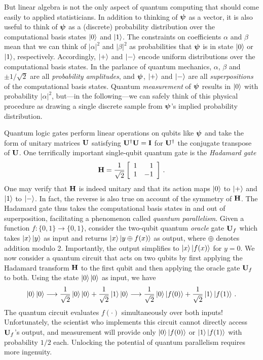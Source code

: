 \documentclass[12pt]{article} %
\begin{document}
But linear algebra is not the only aspect of quantum computing that should come easily to applied statisticians. In addition to thinking of $\boldsymbol{\psi}$ as a vector, it is also useful to think of $\boldsymbol{\psi}$ as a (discrete) probability distribution over the computational basis states $\ket{0}$ and $\ket{1}$. The constraints on coefficients $\alpha$ and $\beta$ mean that we can think of $|\alpha|^2$ and $|\beta|^2$ as probabilities that $\boldsymbol{\psi}$ is in state $\ket{0}$ or $\ket{1}$, respectively.  Accordingly, $\ket{+}$ and $\ket{-}$ encode uniform distributions over the computational basis states.  In the parlance of quantum mechanics, $\alpha$, $\beta$ and $\pm1/\sqrt{2}$ are all \emph{probability amplitudes}, and $\boldsymbol{\psi}$, $\ket{+}$ and $\ket{-}$ are all \emph{superpositions} of the computational basis states. Quantum \emph{measurement} of $\boldsymbol{\psi}$ results in $\ket{0}$ with probability $|\alpha|^2$, but---in the following---we can safely think of this physical procedure as drawing a single discrete sample from $\boldsymbol{\psi}$'s implied probability distribution.

Quantum logic gates perform linear operations on qubits like $\boldsymbol{\psi}$ and take the form of unitary matrices $\mathbf{U}$ satisfying $\mathbf{U}^\dagger \mathbf{U}=\mathbf{I}$ for $\mathbf{U}^\dagger$ the conjugate transpose of $\mathbf{U}$. One terrifically important single-qubit quantum gate is the \emph{Hadamard gate}
\begin{align*}
	\mathbf{H} = \frac{1}{\sqrt{2}} \left[\begin{array}{rr}
		1 & 1 \\
		1 & -1 \end{array}\right] \, .
\end{align*}
One may verify that $\mathbf{H}$ is indeed unitary and that its action maps $\ket{0}$ to $\ket{+}$ and $\ket{1}$ to $\ket{-}$.  In fact, the reverse is also true on account of the symmetry of $\mathbf{H}$.  The Hadamard gate thus takes the computational basis states in and out of superposition, facilitating a phenomenon called \emph{quantum parallelism}. Given a function $f: \{0,1\} \rightarrow \{0,1\}$, consider the two-qubit quantum \emph{oracle} gate $\mathbf{U}_f$ which takes $\ket{x}\ket{y}$ as input and returns $\ket{x}\ket{y\oplus f(x)}$ as output, where $\oplus$ denotes addition modulo 2.  Importantly, the output simplifies to $\ket{x}\ket{f(x)}$ for $y=0$. We now consider a quantum circuit that acts on two qubits by first applying the Hadamard transform $\mathbf{H}$ to the first qubit and then applying the oracle gate $\mathbf{U}_f$ to both. Using the state $\ket{0}\ket{0}$ as input, we have
\begin{align}\label{eq:quantparallel}
	\ket{0}\ket{0} \longrightarrow \frac{1}{\sqrt{2}} \ket{0}\ket{0} + \frac{1}{\sqrt{2}} \ket{1}\ket{0}  \longrightarrow \frac{1}{\sqrt{2}} \ket{0}\ket{f(0)} + \frac{1}{\sqrt{2}} \ket{1}\ket{f(1)} \, .
\end{align}
The quantum circuit evaluates $f(\cdot)$ simultaneously over both inputs!  Unfortunately, the scientist who implements this circuit cannot directly access $\mathbf{U}_f$'s output, and measurement will provide only $\ket{0}\ket{f(0)}$ or $\ket{1}\ket{f(1)}$ with probability $1/2$ each.  Unlocking the potential of quantum parallelism requires more ingenuity.
\end{document}
